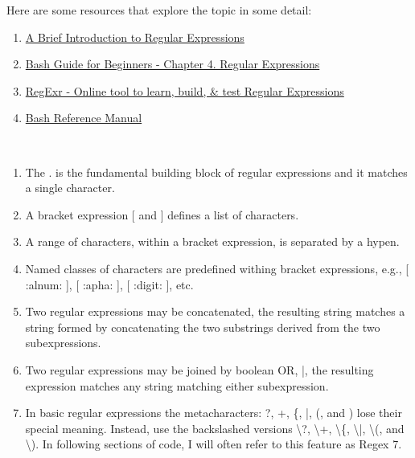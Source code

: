 Here are some resources that explore the topic in some detail:

\begin{enumerate}
	\item{\href{http://tldp.org/LDP/abs/html/x17129.html}{A Brief Introduction to Regular Expressions}}
	\item{\href{http://tldp.org/LDP/Bash-Beginners-Guide/html/chap\_04.html}{Bash Guide for Beginners - Chapter 4. Regular Expressions}}
	\item{\href{http://regexr.com/}{RegExr - Online tool to learn, build, \& test Regular Expressions}}
	\item{\href{https://www.gnu.org/software/bash/manual/bashref.html}{Bash Reference Manual}}	
\end{enumerate}
	
\\

\begin{enumerate}
	\item{The . is the fundamental building block of regular expressions and it matches a single character.}
	\item{A bracket expression [ and ] defines a list of characters.}
	\item{A range of characters, within a bracket expression, is separated by a hypen.}
	\item{Named classes of characters are predefined withing bracket expressions, e.g., [ :alnum: ], [ :apha: ], [ :digit: ], etc.}
	\item{Two regular expressions may be concatenated, the resulting string matches a string formed by concatenating the two substrings derived from the two subexpressions.}
	\item{Two regular expressions may be joined by boolean OR, |, the resulting expression matches any string matching either subexpression.}
	\item{In basic regular expressions the metacharacters: ?, +, \{, |, (, and ) lose their special meaning. Instead, use the backslashed versions \textbackslash{}?, \textbackslash{}+, \textbackslash{}\{, \textbackslash{}|, \textbackslash{}(, and \textbackslash{}).} In following sections of code, I will often refer to this feature as Regex 7.
\end{enumerate}

\\

